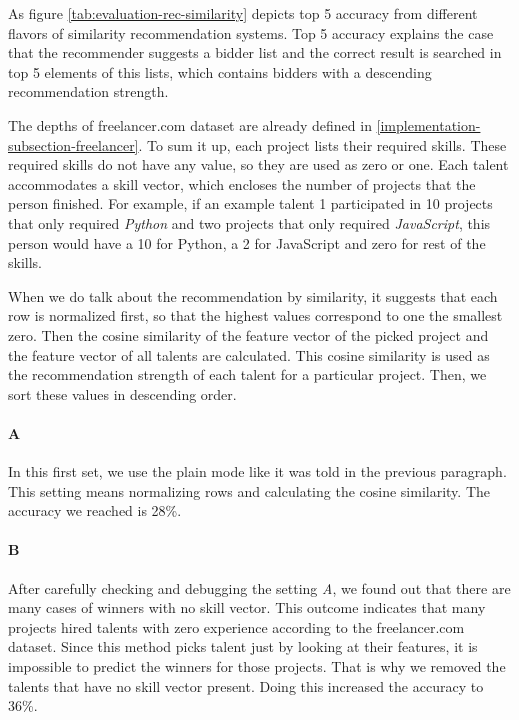 As figure \ref{tab:evaluation-rec-similarity} depicts top 5 accuracy from different flavors of similarity recommendation systems. Top 5 accuracy explains the case that the recommender suggests a bidder list and the correct result is searched in top 5 elements of this lists, which contains bidders with a descending recommendation strength. 

The depths of freelancer.com dataset are already defined in \ref{implementation-subsection-freelancer}. To sum it up, each project lists their required skills. These required skills do not have any value, so they are used as zero or one. Each talent accommodates a skill vector, which encloses the number of projects that the person finished. For example, if an example talent 1 participated in 10 projects that only required \textit{Python} and two projects that only required \textit{JavaScript}, this person would have a 10 for Python, a 2 for JavaScript and zero for rest of the skills. 

When we do talk about the recommendation by similarity, it suggests that each row is normalized first, so that the highest values correspond to one the smallest zero. Then the cosine similarity of the feature vector of the picked project and the feature vector of all talents are calculated. This cosine similarity is used as the recommendation strength of each talent for a particular project. Then, we sort these values in descending order. 

\paragraph{A} In this first set, we use the plain mode like it was told in the previous paragraph. This setting means normalizing rows and calculating the cosine similarity. The accuracy we reached is 28\%. 

\paragraph{B} After carefully checking and debugging the setting \textit{A}, we found out that there are many cases of winners with no skill vector. This outcome indicates that many projects hired talents with zero experience according to the freelancer.com dataset. Since this method picks talent just by looking at their features, it is impossible to predict the winners for those projects. That is why we removed the talents that have no skill vector present. Doing this increased the accuracy to 36\%. 

